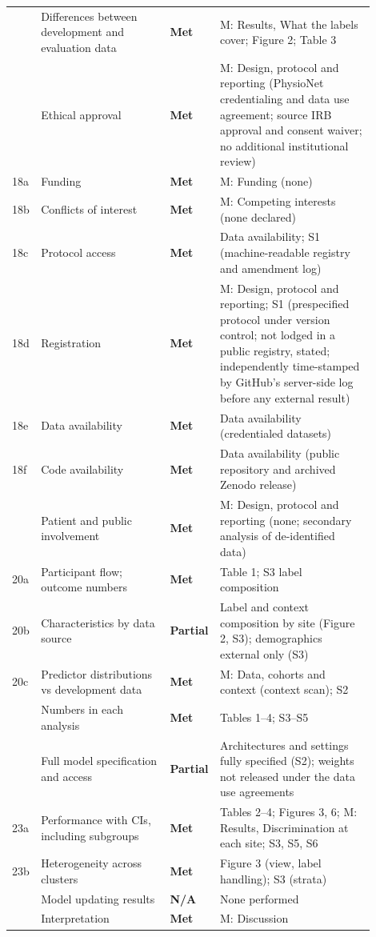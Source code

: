 \documentclass[9pt,a4paper]{extarticle}
\newcommand{\met}{\textbf{Met}}
\newcommand{\partl}{\textbf{Partial}}
\newcommand{\na}{\textbf{N/A}}
\begin{document}
\begin{longtable}{>{\raggedright\arraybackslash}p{0.05\linewidth}>{\raggedright\arraybackslash}p{0.35\linewidth}>{\raggedright\arraybackslash}p{0.08\linewidth}>{\raggedright\arraybackslash}p{0.42\linewidth}}
16 & Differences between development and evaluation data & \met & M: Results, What the labels cover; Figure 2; Table 3\\
17 & Ethical approval & \met & M: Design, protocol and reporting (PhysioNet credentialing and data use agreement; source IRB approval and consent waiver; no additional institutional review)\\
18a & Funding & \met & M: Funding (none)\\
18b & Conflicts of interest & \met & M: Competing interests (none declared)\\
18c & Protocol access & \met & Data availability; S1 (machine-readable registry and amendment log)\\
18d & Registration & \met & M: Design, protocol and reporting; S1 (prespecified protocol under version control; not lodged in a public registry, stated; independently time-stamped by GitHub's server-side log before any external result)\\
18e & Data availability & \met & Data availability (credentialed datasets)\\
18f & Code availability & \met & Data availability (public repository and archived Zenodo release)\\
19 & Patient and public involvement & \met & M: Design, protocol and reporting (none; secondary analysis of de-identified data)\\
20a & Participant flow; outcome numbers & \met & Table 1; S3 label composition\\
20b & Characteristics by data source & \partl & Label and context composition by site (Figure 2, S3); demographics external only (S3)\\
20c & Predictor distributions vs development data & \met & M: Data, cohorts and context (context scan); S2\\
21 & Numbers in each analysis & \met & Tables 1--4; S3--S5\\
22 & Full model specification and access & \partl & Architectures and settings fully specified (S2); weights not released under the data use agreements\\
23a & Performance with CIs, including subgroups & \met & Tables 2--4; Figures 3, 6; M: Results, Discrimination at each site; S3, S5, S6\\
23b & Heterogeneity across clusters & \met & Figure 3 (view, label handling); S3 (strata)\\
24 & Model updating results & \na & None performed\\
25 & Interpretation & \met & M: Discussion\\

\end{longtable}
\end{document}
